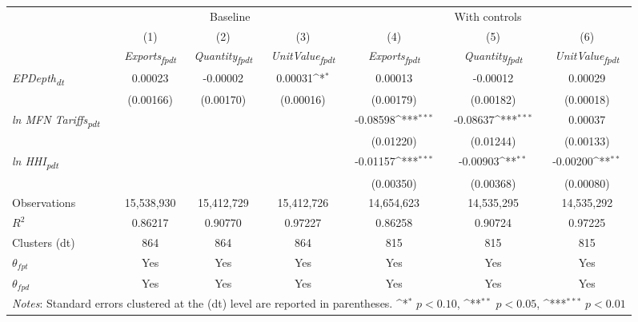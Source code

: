 {
\def\sym#1{\ifmmode^{#1}\else\(^{#1}\)\fi}
\begin{tabular}{l*{6}{c}}
\toprule
&\multicolumn{3}{c}{Baseline}&\multicolumn{3}{c}{With controls}\\\cmidrule(lr){2-4}\cmidrule(lr){5-7}
&(1)&(2)&(3)&(4)&(5)&(6)\\
&\textit{Exports\textsubscript{fpdt}}&\textit{Quantity\textsubscript{fpdt}}&\textit{UnitValue\textsubscript{fpdt}}&\textit{Exports\textsubscript{fpdt}}&\textit{Quantity\textsubscript{fpdt}}&\textit{UnitValue\textsubscript{fpdt}}\\
\midrule
\textit{EPDepth\textsubscript{dt}} & 0.00023 & -0.00002 & 0.00031\sym{*} & 0.00013 & -0.00012 & 0.00029\\
 & (0.00166) & (0.00170) & (0.00016) & (0.00179) & (0.00182) & (0.00018)\\
\addlinespace
\textit{ln MFN Tariffs\textsubscript{pdt}} &  &  &  & -0.08598\sym{***} & -0.08637\sym{***} & 0.00037\\
 &  &  &  & (0.01220) & (0.01244) & (0.00133)\\
\addlinespace
\textit{ln HHI\textsubscript{pdt}} &  &  &  & -0.01157\sym{***} & -0.00903\sym{**} & -0.00200\sym{**}\\
 &  &  &  & (0.00350) & (0.00368) & (0.00080)\\
\midrule
Observations & 15,538,930 & 15,412,729 & 15,412,726 & 14,654,623 & 14,535,295 & 14,535,292\\
$R^{2}$ & 0.86217 & 0.90770 & 0.97227 & 0.86258 & 0.90724 & 0.97225\\
Clusters (dt) & 864 & 864 & 864 & 815 & 815 & 815\\
$\theta_{fpt}$ & Yes & Yes & Yes & Yes & Yes & Yes\\
$\theta_{fpd}$ & Yes & Yes & Yes & Yes & Yes & Yes\\
\bottomrule
\multicolumn{7}{l}{\footnotesize \textit{Notes}: Standard errors clustered at the (dt) level are reported in parentheses. \sym{*} \(p<0.10\), \sym{**} \(p<0.05\), \sym{***} \(p<0.01\)}\\
\end{tabular}
}
